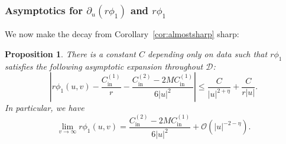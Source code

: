 \documentclass[11pt,english]{article}
\numberwithin{equation}{section}
\theoremstyle{remark}
\theoremstyle{plain}
\newtheorem{prop}{Proposition}[section]
\theoremstyle{remark}
\newcommand{\pu}{\partial_u}
\renewcommand{\(}{\left(}
\renewcommand{\)}{\right)}
\newcommand{\cc}{C_{\mathrm{in}}^{(1)}}
\newcommand{\ccc}{C_{\mathrm{in}}^{(2)}}
\newcommand{\pho}{(r\phi_1)}
\begin{document}
\subsubsection{Asymptotics for \texorpdfstring{$\pu\pho$}{d/du (r phi1)} and \texorpdfstring{$r\phi_1$}{r phi1}}
We now make the decay from Corollary~\ref{cor:almostsharp} sharp:
\begin{prop}
There is a constant $C$ depending only on data such that $r\phi_1$ satisfies the following asymptotic expansion throughout $\mathcal{D}$:
\begin{equation}\label{eq:nl:asy.phi.r}
\left|r\phi_1(u,v)-\frac{\cc}{r}-\frac{\ccc-2M\cc}{6|u|^2}\right|\leq\frac{C}{|u|^{2+\eta}}+\frac{C}{r|u|}.
\end{equation}
In particular, we have
\begin{equation}\label{eq:nl:asy.phi.u}
\lim_{v\to\infty}r\phi_1(u,v)=\frac{\ccc-2M\cc}{6|u|^2}+\mathcal{O}(|u|^{-2-\eta}).
\end{equation}
\end{prop}
\end{document}
